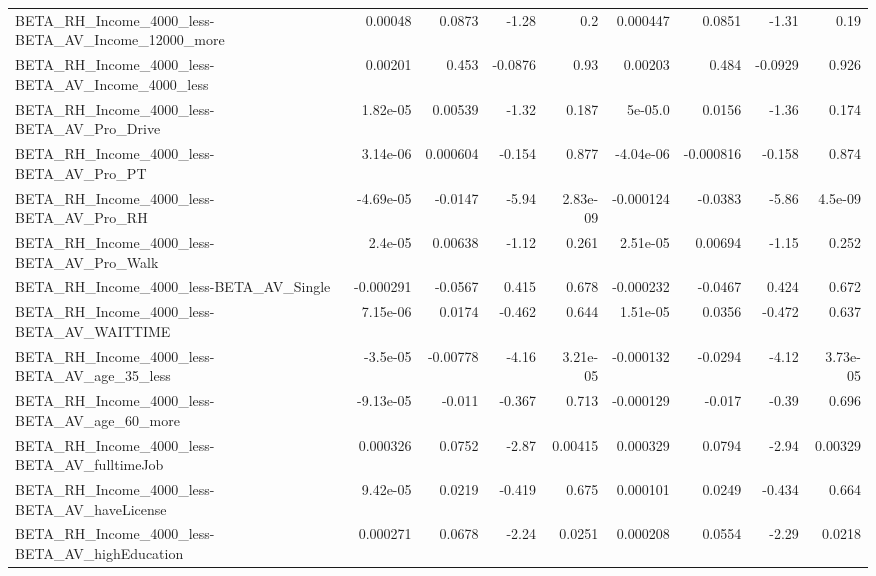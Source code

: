 \begin{tabular}{lrrrrrrrr}
BETA\_RH\_Income\_4000\_less-BETA\_AV\_Income\_12000\_more &     0.00048 &       0.0873 &     -1.28 &      0.2 &   0.000447 &      0.0851 &        -1.31 &          0.19 \\
BETA\_RH\_Income\_4000\_less-BETA\_AV\_Income\_4000\_less  &     0.00201 &        0.453 &   -0.0876 &     0.93 &    0.00203 &       0.484 &      -0.0929 &         0.926 \\
BETA\_RH\_Income\_4000\_less-BETA\_AV\_Pro\_Drive         &    1.82e-05 &      0.00539 &     -1.32 &    0.187 &    5e-05.0 &      0.0156 &        -1.36 &         0.174 \\
BETA\_RH\_Income\_4000\_less-BETA\_AV\_Pro\_PT            &    3.14e-06 &     0.000604 &    -0.154 &    0.877 &  -4.04e-06 &   -0.000816 &       -0.158 &         0.874 \\
BETA\_RH\_Income\_4000\_less-BETA\_AV\_Pro\_RH            &   -4.69e-05 &      -0.0147 &     -5.94 & 2.83e-09 &  -0.000124 &     -0.0383 &        -5.86 &       4.5e-09 \\
BETA\_RH\_Income\_4000\_less-BETA\_AV\_Pro\_Walk          &     2.4e-05 &      0.00638 &     -1.12 &    0.261 &   2.51e-05 &     0.00694 &        -1.15 &         0.252 \\
BETA\_RH\_Income\_4000\_less-BETA\_AV\_Single            &   -0.000291 &      -0.0567 &     0.415 &    0.678 &  -0.000232 &     -0.0467 &        0.424 &         0.672 \\
BETA\_RH\_Income\_4000\_less-BETA\_AV\_WAITTIME          &    7.15e-06 &       0.0174 &    -0.462 &    0.644 &   1.51e-05 &      0.0356 &       -0.472 &         0.637 \\
BETA\_RH\_Income\_4000\_less-BETA\_AV\_age\_35\_less       &    -3.5e-05 &     -0.00778 &     -4.16 & 3.21e-05 &  -0.000132 &     -0.0294 &        -4.12 &      3.73e-05 \\
BETA\_RH\_Income\_4000\_less-BETA\_AV\_age\_60\_more       &   -9.13e-05 &       -0.011 &    -0.367 &    0.713 &  -0.000129 &      -0.017 &        -0.39 &         0.696 \\
BETA\_RH\_Income\_4000\_less-BETA\_AV\_fulltimeJob       &    0.000326 &       0.0752 &     -2.87 &  0.00415 &   0.000329 &      0.0794 &        -2.94 &       0.00329 \\
BETA\_RH\_Income\_4000\_less-BETA\_AV\_haveLicense       &    9.42e-05 &       0.0219 &    -0.419 &    0.675 &   0.000101 &      0.0249 &       -0.434 &         0.664 \\
BETA\_RH\_Income\_4000\_less-BETA\_AV\_highEducation     &    0.000271 &       0.0678 &     -2.24 &   0.0251 &   0.000208 &      0.0554 &        -2.29 &        0.0218 \\

\end{tabular}

